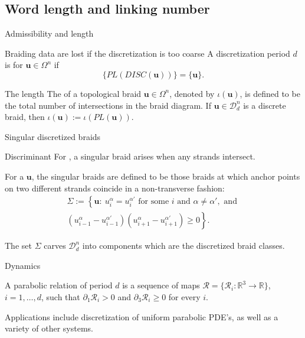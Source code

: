 \documentclass[9pt, english]{beamer}
\theoremstyle{definition}
\newcommand{\simbolovettore}[1]{{\boldsymbol{#1}}}
\newcommand{\vu}{\simbolovettore{u}}
\newcommand{\R}{\mathbb{R}}                     %
\begin{document}
\subsection{Word length and linking number}
\begin{frame}{Admissibility and length}\pause
    \begin{block}{Braiding data are lost if the discretization is too coarse}
            A discretization period $d$ is  for
            $\vu \in \Omega^n$ if
            \[
            \{PL(DISC(\vu))\}=\{\vu\}.
            \]
        \end{block}\pause
        \begin{block}{The length}
            The  of a topological braid $\vu\in \Omega^n$, denoted by
            $\iota(\vu)$, \pause is defined to be the \alert{total number of intersections
            in the braid diagram}. \pause If $\vu \in \mathscr D_d^n$ is  a
            discrete braid, then $\iota(\vu):=\iota(PL(\vu))$.
    \end{block}
\end{frame}
\begin{frame}{Singular discretized braids}
    \begin{block}{Discriminant}\pause
    For , a \alert{singular braid} arises
    when any strands intersect. \pause

For a 
    $\vu$, the \alert{singular braids} are defined to be those braids at
    which anchor points on two different strands coincide in a
    non-transverse fashion:\pause
    \begin{eqnarray*}
        \Sigma :=\left\{\vu: \ u_i^\alpha=u_i^{\alpha'} \text{ for some } i \text{ and } \alpha \neq \alpha',
        \textrm{ and }\right.\\
        \left.  (u_{i-1}^\alpha - u_{i-1}^{\alpha'})(u_{i+1}^\alpha- u_{i+1}^{\alpha'})\geq
        0\right\}.
        \end{eqnarray*}
    \end{block}\pause
    The set $\Sigma$ carves $\mathscr D_d^n$ into components which
    are the discretized braid classes.
\end{frame}
\begin{frame}{Dynamics}
    \begin{block}{A parabolic relation}
        of period $d$ is a sequence of maps $\mathscr R=\{\mathscr R_i:\R^3 \to
        \R\}$, $i=1, \dots, d$, such that $\partial_1 \mathscr R_i >0$ and
        $\partial_3 \mathscr R_i \geq 0$ for every $i$. \pause
        \end{block}
        \begin{block}{Applications}
        include discretization of uniform parabolic PDE's, as well
        as a variety of other systems.
        \end{block}
\end{frame}
\end{document}
